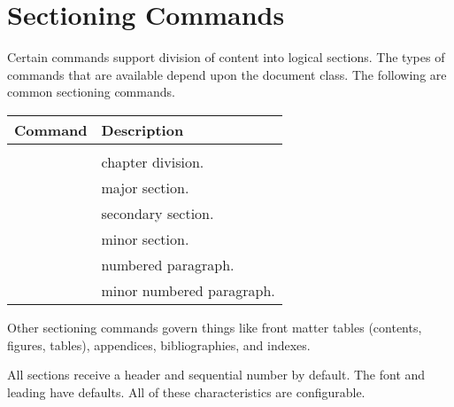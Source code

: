 \section{Sectioning Commands}

Certain commands support division of content into logical sections. The types of commands that are available depend upon the document class. The following are common sectioning commands.

\begin{tabular}{ll}
	\textsf{Command}              & \textsf{Description}\\
	\hline\\[-8pt]
	\verb2\chapter{<name>}2       & chapter division.\\
	\verb2\section{<name>}2       & major section.\\
	\verb2\subsection{<name>}2    & secondary section.\\
	\verb2\subsubsection{<name>}2 & minor section.\\
	\verb2\paragraph{<name>}2     & numbered paragraph.\\
	\verb2\subparagraph{<name>}2  & minor numbered paragraph.
\end{tabular}

Other sectioning commands govern things like front matter tables (contents, figures, tables), appendices, bibliographies, and indexes.

All sections receive a header and sequential number by default. The font and leading have defaults. All of these characteristics are configurable.
